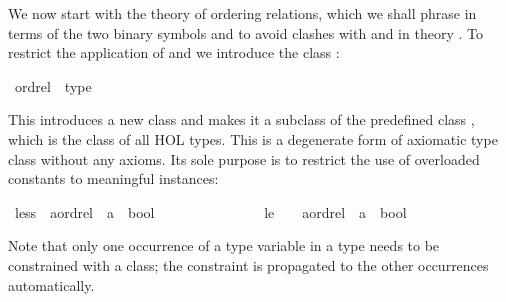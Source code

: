 %
\begin{isabellebody}%
\def\isabellecontext{Overloading{\isadigit{1}}}%
\isamarkupfalse%
%
\isamarkuptrue%
%
\begin{isamarkuptext}%
We now start with the theory of ordering relations, which we shall phrase
in terms of the two binary symbols \isa{{\isacharless}{\isacharless}} and \isa{{\isacharless}{\isacharless}{\isacharequal}}
to avoid clashes with \isa{{\isacharless}} and \isa{{\isacharless}{\isacharequal}} in theory . To restrict the application of \isa{{\isacharless}{\isacharless}} and \isa{{\isacharless}{\isacharless}{\isacharequal}} we
introduce the class :%
\end{isamarkuptext}%
\isamarkuptrue%
\ ordrel\ {\isacharless}\ type\isamarkupfalse%
%
\begin{isamarkuptext}%
\noindent
This introduces a new class  and makes it a subclass of
the predefined class , which
is the class of all HOL types.
This is a degenerate form of axiomatic type class without any axioms.
Its sole purpose is to restrict the use of overloaded constants to meaningful
instances:%
\end{isamarkuptext}%
\isamarkuptrue%
\ less\ {\isacharcolon}{\isacharcolon}\ {\isachardoublequote}{\isacharparenleft}{\isacharprime}a{\isacharcolon}{\isacharcolon}ordrel{\isacharparenright}\ {\isasymRightarrow}\ {\isacharprime}a\ {\isasymRightarrow}\ bool{\isachardoublequote}\ \ \ \ \ {\isacharparenleft}\ {\isachardoublequote}{\isacharless}{\isacharless}{\isachardoublequote}\ \ {}{}{\isacharparenright}\isanewline
\ \ \ \ \ \ \ le\ \ \ {\isacharcolon}{\isacharcolon}\ {\isachardoublequote}{\isacharparenleft}{\isacharprime}a{\isacharcolon}{\isacharcolon}ordrel{\isacharparenright}\ {\isasymRightarrow}\ {\isacharprime}a\ {\isasymRightarrow}\ bool{\isachardoublequote}\ \ \ \ \ {\isacharparenleft}\ {\isachardoublequote}{\isacharless}{\isacharless}{\isacharequal}{\isachardoublequote}\ {}{}{\isacharparenright}\isamarkupfalse%
%
\begin{isamarkuptext}%
\noindent
Note that only one occurrence of a type variable in a type needs to be
constrained with a class; the constraint is propagated to the other
occurrences automatically.


\end{isamarkuptext}
\end{isabellebody}
